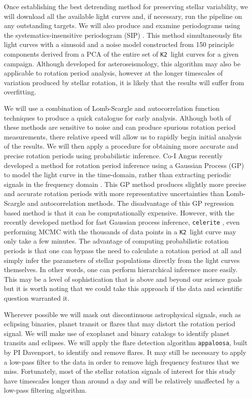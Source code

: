 \documentclass[12pt]{article}
\newcommand{\ktwo}{{\tt K2}}
\begin{document}
Once establishing the best detrending method for preserving stellar
variability, we will download all the available light curves and, if
necessary, run the pipeline on any outstanding targets.
We will also produce and examine periodograms using the
systematics-insensitive periodogram (SIP) \citep{angus2015}.
This method simultaneously fits light curves with a sinusoid and a noise
model constructed from 150 principle components derived from a PCA of the
entire set of \ktwo\ light curves for a given campaign.
Although developed for asteroseismology, this algorithm may also be applicable
to rotation period analysis, however at the longer timescales of variation
produced by stellar rotation, it is likely that the results will suffer
from overfitting.

We will use a combination of Lomb-Scargle and autocorrelation function
techniques to produce a quick catalogue for early analysis.
Although both of these methods are sensitive to noise and can produce spurious
rotation period measurements, there relative speed will allow us to rapidly
begin initial analysis of the results.
We will then apply a procedure for obtaining more accurate and precise
rotation periods using probabilistic inference.
Co-I Angus recently developed a method for rotation period inference using a
Gaussian Process (GP) to model the light curve in the time-domain, rather than
extracting periodic signals in the frequency domain \citet{angus2016c}.
This GP method produces slightly more precise and accurate rotation periods
with more representative uncertainties than Lomb-Scargle and autocorrelation
methods.
The disadvantage of this GP regression based method is that it can be
computationally expensive.
However, with the recently developed method for fast Gaussian process
inference, {\tt celerite} \citep{foreman-mackey2017}, even performing MCMC
with the thousands of data points in a \ktwo\ light curve may only take a few
minutes.
The advantage of computing probabilistic rotation periods is that one can
bypass the need to calculate a rotation period at all and simply infer the
parameters of stellar populations directly from the light curves themselves.
In other words, one can perform hierarchical inference more easily.
This may be a level of sophistication that is above and beyond our science
goals but it is worth noting that we could take this approach if the data and
scientific question warranted it.

Wherever possible we will mask out discontinuous astrophysical signals, such as
eclipsing binaries, planet transit or flares that may distort the rotation
period signal.
We will make use of exoplanet and binary catalogs to identify planet transits
and eclipses.
We will apply the flare detection algorithm {\tt appaloosa}, built by PI Davenport,
to identify and remove flares.
It may still be necessary to apply a low-pass filter to the data in order to
remove high frequency features that we miss.
Fortunately, most of the stellar rotation signals of interest for this study
have timescales longer than around a day and will be relatively unaffected by
a low-pass filtering algorithm.
\end{document}
